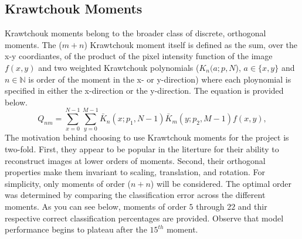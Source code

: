 \documentclass[12pt]{article}
\begin{document}
\subsection{Krawtchouk Moments}
Krawtchouk moments belong to the broader class of discrete, orthogonal moments. The ($m+n$) Krawtchouk moment itself is defined as the sum, over the x-y coordiantes, of the product of the pixel intensity function of the image $f(x,y)$ and two weighted Krawtchouk polynomials ($K_n(a;p,N$), $a\in \{x,y\}$ and $n\in \mathbb{N}$ is order of the moment in the x- or y-direction) where each ploynomial is specified in either the x-direction or the y-direction. The equation is provided below.
\begin{equation*}
Q_{nm} = \sum_{x=0}^{N-1}\sum_{y=0}^{M-1}\bar{K}_n(x;p_1,N-1)\bar{K}_m(y;p_2,M-1)f(x,y),
\end{equation*}
The motivation behind choosing to use Krawtchouk moments for the project is two-fold. First, they appear to be popular in the literture for their ability to reconstruct images at lower orders of moments. Second, their orthogonal properties make them invariant to scaling, translation, and rotation. For simplicity, only moments of order ($n+n$) will be considered. The optimal order was determined by comparing the classification error across the different moments. As you can see below, moments of order $5$ through $22$ and thir respective correct classification percentages are provided. Observe that model performance begins to plateau after the $15^{th}$ moment.
\begin{figure}[h]
	\begin{center}	
	\end{center}
\end{figure} 
\end{document}
